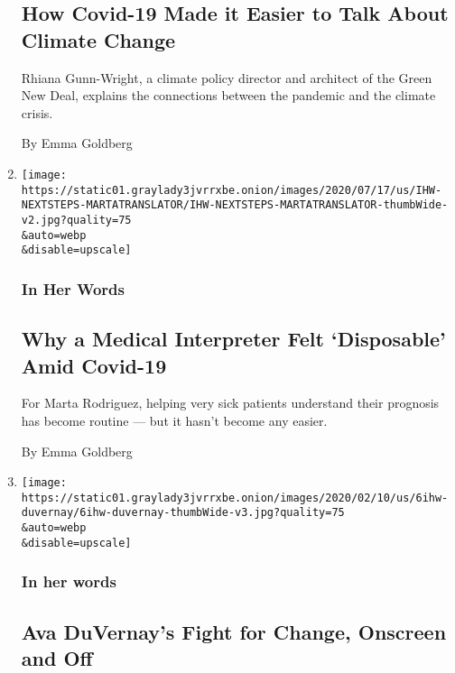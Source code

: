 \begin{enumerate}
{  \subsection{How Covid-19 Made it Easier to Talk About Climate
  Change}\label{how-covid-19-made-it-easier-to-talk-about-climate-change}}

  Rhiana Gunn-Wright, a climate policy director and architect of the
  Green New Deal, explains the connections between the pandemic and the
  climate crisis.

  By Emma Goldberg
\item
  \href{/2020/07/20/us/medical-interpreter-covid-hospitals-coronavirus.html}{}

  \texttt{[image: https://static01.graylady3jvrrxbe.onion/images/2020/07/17/us/IHW-NEXTSTEPS-MARTATRANSLATOR/IHW-NEXTSTEPS-MARTATRANSLATOR-thumbWide-v2.jpg?quality=75\\\&auto=webp\\\&disable=upscale]}

  \hypertarget{in-her-words-2}{%
  \subsubsection{In Her Words}\label{in-her-words-2}}

  \hypertarget{why-a-medical-interpreter-felt-disposable-amid-covid-19}{%
  \subsection{Why a Medical Interpreter Felt `Disposable' Amid
  Covid-19}\label{why-a-medical-interpreter-felt-disposable-amid-covid-19}}

  For Marta Rodriguez, helping very sick patients understand their
  prognosis has become routine --- but it hasn't become any easier.

  By Emma Goldberg
\item
  \href{/2020/07/08/movies/director-ava-duvernay-movies-police-protests.html}{}

  \texttt{[image: https://static01.graylady3jvrrxbe.onion/images/2020/02/10/us/6ihw-duvernay/6ihw-duvernay-thumbWide-v3.jpg?quality=75\\\&auto=webp\\\&disable=upscale]}

  \hypertarget{in-her-words-3}{%
  \subsubsection{In her words}\label{in-her-words-3}}

  \hypertarget{ava-duvernays-fight-for-change-onscreen-and-off}{%
  \subsection{Ava DuVernay's Fight for Change, Onscreen and
  Off}\label{ava-duvernays-fight-for-change-onscreen-and-off}}


\end{enumerate}
